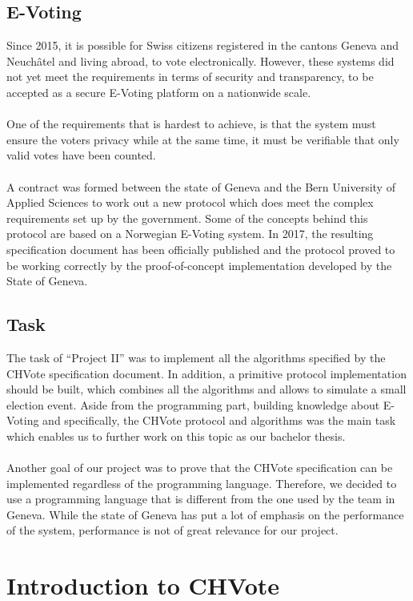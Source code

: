 \documentclass[a4paper,12pt]{report}
\theoremstyle{definition}
\begin{document}
\section{E-Voting}
Since 2015, it is possible for Swiss citizens registered in the cantons Geneva and Neuchâtel and living abroad, to vote electronically. However, these systems did not yet meet the requirements in terms of security and transparency, to be accepted as a secure E-Voting platform on a nationwide scale.\\\\
One of the requirements that is hardest to achieve, is that the system must ensure the voters privacy while at the same time, it must be verifiable that only valid votes have been counted.\\\\
A contract was formed between the state of Geneva and the Bern University of Applied Sciences to work out a new protocol which does meet the complex requirements set up by the government. Some of the concepts behind this protocol are based on a Norwegian E-Voting system. In 2017, the resulting specification document has been officially published and the protocol proved to be working correctly by the proof-of-concept implementation developed by the State of Geneva. 
\section{Task}
The task of "`Project II"' was to implement all the algorithms specified by the CHVote specification document. In addition, a primitive protocol implementation should be built, which combines all the algorithms and allows to simulate a small election event. Aside from the programming part, building knowledge about E-Voting and specifically, the CHVote protocol and algorithms was the main task which enables us to further work on this topic as our bachelor thesis.\\\\
\noindent Another goal of our project was to prove that the CHVote specification can be implemented regardless of the programming language. Therefore, we decided to use a programming language that is different from the one used by the team in Geneva. While the state of Geneva has put a lot of emphasis on the performance of the system, performance is not of great relevance for our project. 
\chapter{Introduction to CHVote}
\end{document}

